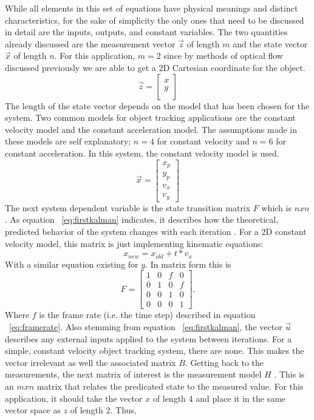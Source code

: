 \documentclass[12pt]{article} %
\begin{document}
While all elements in this set of equations have physical meanings and distinct characteristics, for the sake of simplicity the only ones that need to be discussed in detail are the inputs, outputs, and constant variables. The two quantities already discussed are the measurement vector $\vec{z}$ of length $m$ and the state vector $\vec{x}$ of length $n$. For this application, $m = 2$ since by methods of optical flow discussed previously we are able to get a 2D Cartesian coordinate for the object.
\begin{equation}
\vec{z} = \begin{bmatrix}
x \\
y \\
\end{bmatrix}
\end{equation}
The length of the state vector depends on the model that has been chosen for the system. Two common models for object tracking applications are the constant velocity model and the constant acceleration model. The assumptions made in these models are self explanatory; $n=4$ for constant velocity and $n=6$ for constant acceleration. In this system, the constant velocity model is used.
\begin{equation}
 \vec{x} = \begin{bmatrix}
x_p \\
y_p \\
v_x \\
v_y
\end{bmatrix}
\end{equation}
The next system dependent variable is the state transition matrix $F$ which is $nxn$. As equation ~\ref{eq:firstkalman} indicates, it describes how the theoretical, predicted behavior of the system changes with each iteration \cite{12}. For a 2D constant velocity model, this matrix is just implementing kinematic equations:
\begin{equation}
x_{new} = x_{old} + t * v_x
\end{equation}
With a similar equation existing for $y$. In matrix form this is 
\begin{equation}
F= \begin{bmatrix}
1 & 0 & f & 0 \\
0 & 1 & 0 & f \\
0 & 0 & 1 & 0 \\
0 & 0 & 0 & 1
\end{bmatrix}.
\end{equation}
Where $f$ is the frame rate (i.e. the time step) described in equation ~\ref{eq:framerate}. Also stemming from equation ~\ref{eq:firstkalman}, the vector $\vec{u}$ describes any external inputs applied to the system between iterations. For a simple, constant velocity object tracking system, there are none. This makes the vector irrelevant as well the associated matrix $B$. Getting back to the measurements, the next matrix of interest is the measurement model $H$ \cite{4}. This is an $mxn$ matrix that relates the predicated state to the measured value. For this application, it should take the vector $x$ of length 4 and place it in the same vector space as $z$ of length 2. Thus,
\end{document}
